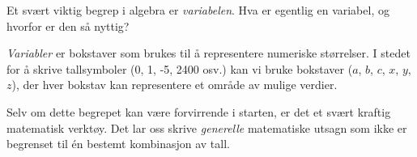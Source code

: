 

Et svært viktig begrep i algebra er {\it variabelen}. Hva er egentlig en variabel, og hvorfor er den så nyttig?







{\it Variabler} er bokstaver som brukes til å representere numeriske størrelser. I stedet for å skrive tallsymboler (0, 1, -5, 2400 osv.) kan vi bruke bokstaver ($a$, $b$, $c$, $x$, $y$, $z$), der hver bokstav kan representere et område av mulige verdier.







Selv om dette begrepet kan være forvirrende i starten, er det et svært kraftig matematisk verktøy. Det lar oss skrive {\it generelle} matematiske utsagn som ikke er begrenset til én bestemt kombinasjon av tall.


